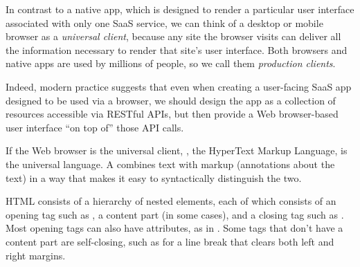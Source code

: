 %
%
%
\label{sec:10k}
\label{sec:html}
\label{sec:css}



In contrast to a native app, which is designed to render a particular user
interface associated with only one SaaS service,
we can think of a desktop or mobile browser as a \emph{universal
client}, because any site the browser visits can deliver all the
information necessary to render that site's user interface.
Both browsers and native apps are used by millions of people, so we
call them \emph{production clients}.


Indeed, modern practice suggests that even when creating a user-facing SaaS app designed to be used
via a browser, we should design the app as a collection of resources accessible via RESTful APIs,
but then provide a Web browser-based user interface ``on top of'' those API calls.


If the Web browser is the universal client, , the
HyperText Markup Language, is the
universal language.
A 
combines text with markup (annotations about the text) in a way
that makes it easy to
syntactically distinguish the two.

HTML consists of a hierarchy of nested elements,
each of which consists of an opening tag such as ,
a content part (in some cases), and a closing tag such as .
Most opening tags can also have attributes, as in
.
Some tags that don't have a content part are self-closing, such as
 for a line break that clears both left and
right margins.

